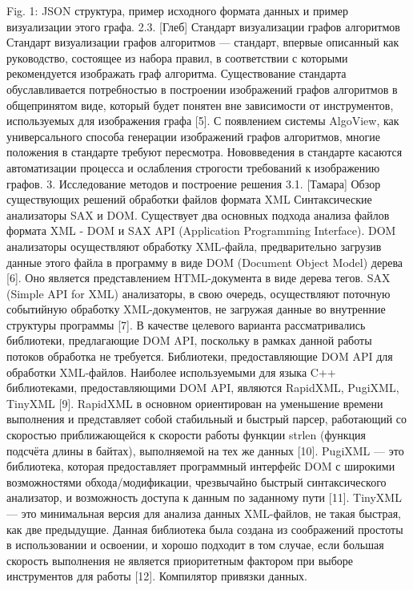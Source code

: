 Fig. 1: JSON структура, пример исходного формата данных и пример визуализации этого графа.
2.3. [Глеб] Стандарт визуализации графов алгоритмов
Стандарт визуализации графов алгоритмов — стандарт, впервые описанный как руководство, состоящее из набора правил, в соответствии с которыми рекомендуется изображать граф алгоритма. Существование стандарта обуславливается потребностью в построении изображений графов алгоритмов в общепринятом виде, который будет понятен вне зависимости от инструментов, используемых для изображения графа [5]. С появлением системы AlgoView, как универсального способа генерации изображений графов алгоритмов, многие положения в стандарте требуют пересмотра. Нововведения в стандарте касаются автоматизации процесса и ослабления строгости требований к изображению графов.
3. Исследование методов и построение решения
3.1. [Тамара] Обзор существующих решений обработки файлов формата XML
Синтаксические анализаторы SAX и DOM.
Существует два основных подхода анализа файлов формата XML - DOM и SAX API (Application Programming Interface).
DOM анализаторы осуществляют обработку XML-файла, предварительно загрузив данные этого файла в программу в виде DOM (Document Object Model) дерева [6]. Оно является представлением HTML-документа в виде дерева тегов.
SAX (Simple API for XML) анализаторы, в свою очередь, осуществляют поточную событийную обработку XML-документов, не загружая данные во внутренние структуры программы [7].
В качестве целевого варианта рассматривались библиотеки, предлагающие DOM API, поскольку в рамках данной работы потоков обработка не требуется.
Библиотеки, предоставляющие DOM API для обработки XML-файлов.
Наиболее используемыми для языка C++ библиотеками, предоставляющими DOM API, являются RapidXML, PugiXML, TinyXML [9].
RapidXML в основном ориентирован на уменьшение времени выполнения и представляет собой стабильный и быстрый парсер, работающий со скоростью приближающейся к скорости работы функции strlen (функция подсчёта длины в байтах), выполняемой на тех же данных [10].
PugiXML — это библиотека, которая предоставляет программный интерфейс DOM с широкими возможностями обхода/модификации, чрезвычайно быстрый синтаксического анализатор, и возможность доступа к данным по заданному пути [11].
TinyXML — это минимальная версия для анализа данных XML-файлов, не такая быстрая, как две предыдущие. Данная библиотека была создана из соображений простоты в использовании и освоении, и хорошо подходит в том случае, если большая скорость выполнения не является приоритетным фактором при выборе инструментов для работы [12].
Компилятор привязки данных.
